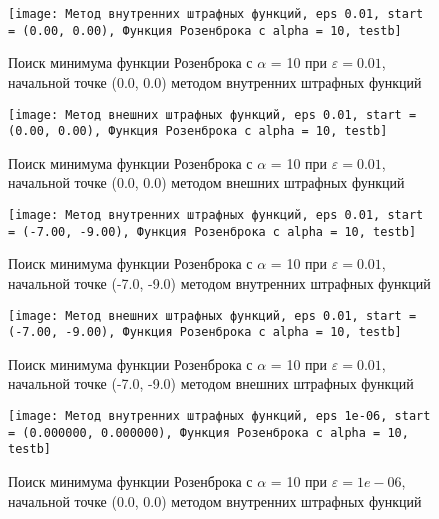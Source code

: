             \begin{figure}[H]
	        \centering
	        \texttt{[image: Метод внутренних штрафных функций, eps 0.01, start = (0.00, 0.00), Функция Розенброка с alpha = 10, testb]}%
	        \caption{Поиск минимума функции Розенброка с $\alpha$ = 10 при $\varepsilon = 0.01$, начальной точке (0.0, 0.0) методом внутренних штрафных функций}
	        \vspace*{-1.2cm}
            \end{figure}
            
            \begin{figure}[H]
	        \centering
	        \texttt{[image: Метод внешних штрафных функций, eps 0.01, start = (0.00, 0.00), Функция Розенброка с alpha = 10, testb]}%
	        \caption{Поиск минимума функции Розенброка с $\alpha$ = 10 при $\varepsilon = 0.01$, начальной точке (0.0, 0.0) методом внешних штрафных функций}
	        \vspace*{-1.2cm}
            \end{figure}
            
            \begin{figure}[H]
	        \centering
	        \texttt{[image: Метод внутренних штрафных функций, eps 0.01, start = (-7.00, -9.00), Функция Розенброка с alpha = 10, testb]}%
	        \caption{Поиск минимума функции Розенброка с $\alpha$ = 10 при $\varepsilon = 0.01$, начальной точке (-7.0, -9.0) методом внутренних штрафных функций}
	        \vspace*{-1.2cm}
            \end{figure}
            
            \begin{figure}[H]
	        \centering
	        \texttt{[image: Метод внешних штрафных функций, eps 0.01, start = (-7.00, -9.00), Функция Розенброка с alpha = 10, testb]}%
	        \caption{Поиск минимума функции Розенброка с $\alpha$ = 10 при $\varepsilon = 0.01$, начальной точке (-7.0, -9.0) методом внешних штрафных функций}
	        \vspace*{-1.2cm}
            \end{figure}
            
            \begin{figure}[H]
	        \centering
	        \texttt{[image: Метод внутренних штрафных функций, eps 1e-06, start = (0.000000, 0.000000), Функция Розенброка с alpha = 10, testb]}%
	        \caption{Поиск минимума функции Розенброка с $\alpha$ = 10 при $\varepsilon = 1e-06$, начальной точке (0.0, 0.0) методом внутренних штрафных функций}
	        \vspace*{-1.2cm}
            \end{figure}
            
